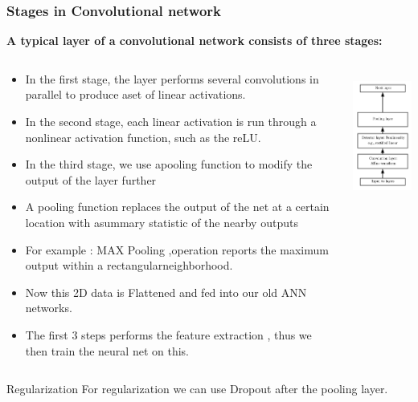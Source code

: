\documentclass[12pt,t]{beamer}
\begin{document}
\begin{frame}
    \frametitle{Stages in Convolutional network}
    \scriptsize
    \textbf{A typical layer of a convolutional network consists of three stages:}

    \begin{columns}
        \begin{column}[T]{0.8\linewidth}
            \begin{itemize}
                \item In the ﬁrst stage, the layer performs several convolutions in parallel to 
                produce aset of linear activations.
                \item In the second stage, each linear activation is run through a nonlinear activation function,
                 such as the reLU.
                 \item In the third stage, we use apooling function to modify the output of the layer further
                 \item A pooling function replaces the output of the net at a certain location with asummary statistic of the nearby outputs
                 \item For example : MAX Pooling ,operation reports the maximum output within a rectangularneighborhood.
                 \item Now this 2D data is Flattened and fed into our old ANN networks.
                 \item The first 3 steps performs the feature extraction , thus we then train the neural net on this.
        
            \end{itemize}
        \end{column}
        \begin{column}[T]{0.3\linewidth}
            \begin{column}[T]{0.5\linewidth}
                \includegraphics[width=100pt,height=120pt]{convolution_network/layers_in_convolution_net.png}
            \end{column}
        \end{column}
    \end{columns}
    \begin{block}{Regularization}
        For regularization we can use Dropout after the pooling layer.
    \end{block}
\end{frame}
\end{document}

